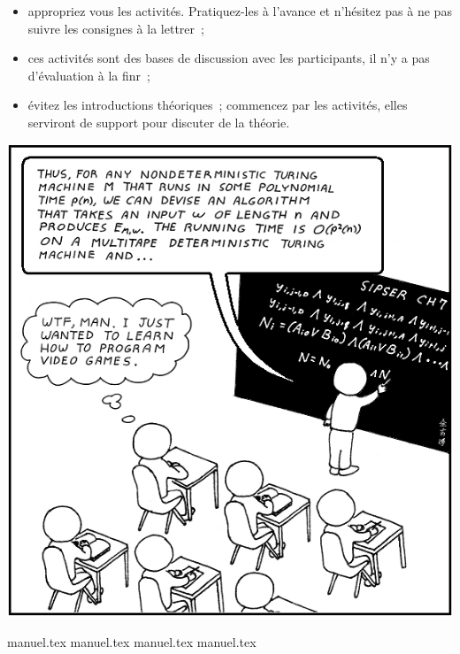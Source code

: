 \documentclass[a5paper,pagesize,DIV=14]{scrbook}
\begin{document}
\begin{itemize}
\item appropriez vous les activités. Pratiquez-les à l'avance et n'hésitez pas à
  ne pas suivre les consignes à la lettrer~;
\item ces activités sont des bases de discussion avec les participants, il n'y a
  pas d'évaluation à la finr~;
\item évitez les introductions théoriques~; commencez par les activités, elles
  serviront de support pour discuter de la théorie.
\end{itemize}

\begin{center}
  \includegraphics[width=0.7\linewidth]{img/computer_science_major.PNG}
  \label{img:CSmajor}
\end{center}

{manuel.tex}
{manuel.tex}
{manuel.tex}
{manuel.tex}
\end{document}
